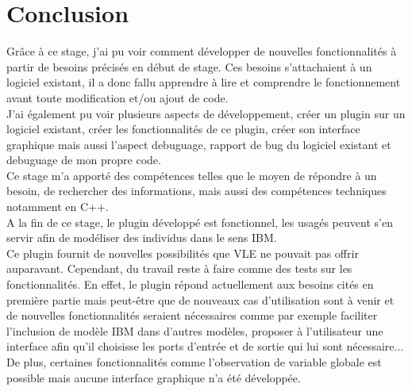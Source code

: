\chapter{Conclusion}
\setlength{\parskip}{2.5ex plus .4ex minus .4ex}
Grâce à ce stage, j'ai pu voir comment développer de nouvelles fonctionnalités à partir de besoins précisés en début de stage. Ces besoins s'attachaient à un logiciel existant, il a donc fallu apprendre à lire et comprendre le fonctionnement avant toute modification et/ou ajout de code.\\
J'ai également pu voir plusieurs aspects de développement, créer un plugin sur un logiciel existant, créer les fonctionnalités de ce plugin, créer son interface graphique mais aussi l'aspect debuguage, rapport de bug du logiciel existant et debuguage de mon propre code.\\
Ce stage m'a apporté des compétences telles que le moyen de répondre à un besoin, de rechercher des informations, mais aussi des compétences techniques notamment en C++.\\

A la fin de ce stage, le plugin développé est fonctionnel, les usagés peuvent s'en servir afin de modéliser des individus dans le sens IBM.\\
Ce plugin fournit de nouvelles possibilités que VLE ne pouvait pas offrir auparavant. Cependant, du travail reste à faire comme des tests sur les fonctionnalités. En effet, le plugin répond actuellement aux besoins cités en première partie mais peut-être que de nouveaux cas d'utilisation sont à venir et de nouvelles fonctionnalités seraient nécessaires comme par exemple faciliter l'inclusion de modèle IBM dans d'autres modèles, proposer à l'utilisateur une interface afin qu'il choisisse les ports d'entrée et de sortie qui lui sont nécessaire...\\
De plus, certaines fonctionnalités comme l'observation de variable globale est possible mais aucune interface graphique n'a été développée.\\
